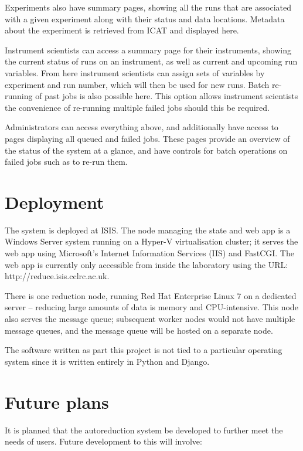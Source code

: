\documentclass[twocolumn]{article}
\begin{document}
Experiments also have summary pages, showing all the runs that are
associated with a given experiment along with their status and data
locations. Metadata about the experiment is retrieved from ICAT and
displayed here.

Instrument scientists can access a summary page for their instruments,
showing the current status of runs on an instrument, as well as current
and upcoming run variables. From here instrument scientists can assign
sets of variables by experiment and run number, which will then be used
for new runs. Batch re-running of past jobs
is also possible here. This option allows instrument scientists
the convenience of re-running multiple failed jobs should this be required. 

Administrators can access everything above, and additionally have access
to pages displaying all queued and failed jobs. These pages provide an
overview of the status of the system at a glance, and have controls for
batch operations on failed jobs such as to re-run them.

\section{Deployment}\label{deployment}

The system is deployed at ISIS. The node managing
the state and web app is a Windows Server system running on a 
Hyper-V\cite{hyper-v} virtualisation cluster; it serves the web app using
Microsoft's Internet Information Services (IIS)\cite{iis} and 
FastCGI\cite{fcgi}. The web app is currently only accessible from inside
the laboratory using the URL: http://reduce.isis.cclrc.ac.uk. 

There is one reduction node, running Red Hat Enterprise Linux 7\cite{rhel}
on a dedicated server -- reducing large amounts of data is memory and CPU-intensive.
This node also serves the message queue; subsequent worker nodes would
not have multiple message queues, and the message queue will be hosted
on a separate node.

The software written as part this project is not tied to a
particular operating system since it is written entirely in Python and Django. 

\section{Future plans}\label{future-plans}

It is planned that the autoreduction system be developed to further meet
the needs of users. Future development to this will involve:
\end{document}
